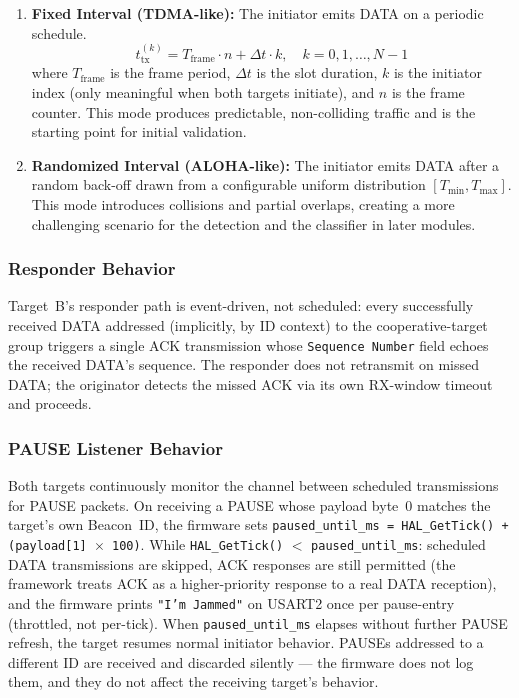 \documentclass[11pt,letterpaper]{article}
\begin{document}
	\begin{enumerate}[leftmargin=2em]
		\item \textbf{Fixed Interval (TDMA-like):} The initiator emits DATA on a periodic schedule.
		\begin{equation}
			t_{\text{tx}}^{(k)} = T_{\text{frame}} \cdot n + \Delta t \cdot k, \quad k = 0, 1, \ldots, N-1
			\label{eq:tdma}
		\end{equation}
		where $T_{\text{frame}}$ is the frame period, $\Delta t$ is the slot duration, $k$ is the initiator index (only meaningful when both targets initiate), and $n$ is the frame counter. This mode produces predictable, non-colliding traffic and is the starting point for initial validation.

		\item \textbf{Randomized Interval (ALOHA-like):} The initiator emits DATA after a random back-off drawn from a configurable uniform distribution $[T_{\min}, T_{\max}]$. This mode introduces collisions and partial overlaps, creating a more challenging scenario for the \FPGA{} detection and the \ML{} classifier in later modules.
	\end{enumerate}

	\subsubsection{Responder Behavior}

	Target~B's responder path is event-driven, not scheduled: every successfully received DATA addressed (implicitly, by ID context) to the cooperative-target group triggers a single ACK transmission whose \texttt{Sequence Number} field echoes the received DATA's sequence. The responder does not retransmit on missed DATA; the originator detects the missed ACK via its own RX-window timeout and proceeds.

	\subsubsection{PAUSE Listener Behavior}

	Both targets continuously monitor the channel between scheduled transmissions for PAUSE packets. On receiving a PAUSE whose payload byte~0 matches the target's own Beacon~ID, the firmware sets \texttt{paused\_until\_ms = HAL\_GetTick() + (payload[1] $\times$ 100)}. While \texttt{HAL\_GetTick()} $<$ \texttt{paused\_until\_ms}: scheduled DATA transmissions are skipped, ACK responses are still permitted (the framework treats ACK as a higher-priority response to a real DATA reception), and the firmware prints \texttt{"I'm Jammed"} on USART2 once per pause-entry (throttled, not per-tick). When \texttt{paused\_until\_ms} elapses without further PAUSE refresh, the target resumes normal initiator behavior. PAUSEs addressed to a different ID are received and discarded silently --- the firmware does not log them, and they do not affect the receiving target's behavior.
\end{document}
